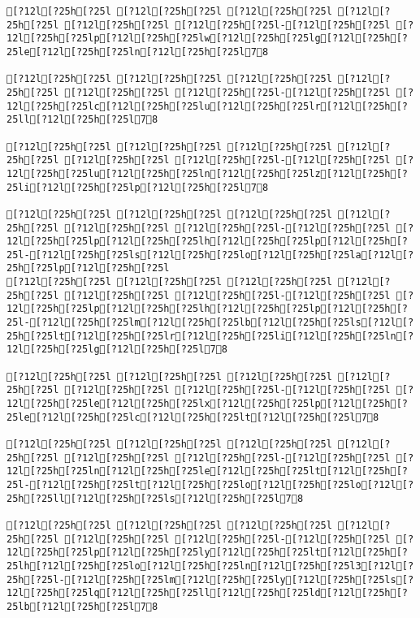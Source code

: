 \documentclass{scrartcl}
\begin{document}
\begin{Verbatim}
[?12l[?25h[?25l [?12l[?25h[?25l [?12l[?25h[?25l [?12l[?25h[?25l [?12l[?25h[?25l [?12l[?25h[?25l-[?12l[?25h[?25l [?12l[?25h[?25lp[?12l[?25h[?25lw[?12l[?25h[?25lg[?12l[?25h[?25le[?12l[?25h[?25ln[?12l[?25h[?25l78

[?12l[?25h[?25l [?12l[?25h[?25l [?12l[?25h[?25l [?12l[?25h[?25l [?12l[?25h[?25l [?12l[?25h[?25l-[?12l[?25h[?25l [?12l[?25h[?25lc[?12l[?25h[?25lu[?12l[?25h[?25lr[?12l[?25h[?25ll[?12l[?25h[?25l78

[?12l[?25h[?25l [?12l[?25h[?25l [?12l[?25h[?25l [?12l[?25h[?25l [?12l[?25h[?25l [?12l[?25h[?25l-[?12l[?25h[?25l [?12l[?25h[?25lu[?12l[?25h[?25ln[?12l[?25h[?25lz[?12l[?25h[?25li[?12l[?25h[?25lp[?12l[?25h[?25l78

[?12l[?25h[?25l [?12l[?25h[?25l [?12l[?25h[?25l [?12l[?25h[?25l [?12l[?25h[?25l [?12l[?25h[?25l-[?12l[?25h[?25l [?12l[?25h[?25lp[?12l[?25h[?25lh[?12l[?25h[?25lp[?12l[?25h[?25l-[?12l[?25h[?25ls[?12l[?25h[?25lo[?12l[?25h[?25la[?12l[?25h[?25lp[?12l[?25h[?25l
[?12l[?25h[?25l [?12l[?25h[?25l [?12l[?25h[?25l [?12l[?25h[?25l [?12l[?25h[?25l [?12l[?25h[?25l-[?12l[?25h[?25l [?12l[?25h[?25lp[?12l[?25h[?25lh[?12l[?25h[?25lp[?12l[?25h[?25l-[?12l[?25h[?25lm[?12l[?25h[?25lb[?12l[?25h[?25ls[?12l[?25h[?25lt[?12l[?25h[?25lr[?12l[?25h[?25li[?12l[?25h[?25ln[?12l[?25h[?25lg[?12l[?25h[?25l78

[?12l[?25h[?25l [?12l[?25h[?25l [?12l[?25h[?25l [?12l[?25h[?25l [?12l[?25h[?25l [?12l[?25h[?25l-[?12l[?25h[?25l [?12l[?25h[?25le[?12l[?25h[?25lx[?12l[?25h[?25lp[?12l[?25h[?25le[?12l[?25h[?25lc[?12l[?25h[?25lt[?12l[?25h[?25l78

[?12l[?25h[?25l [?12l[?25h[?25l [?12l[?25h[?25l [?12l[?25h[?25l [?12l[?25h[?25l [?12l[?25h[?25l-[?12l[?25h[?25l [?12l[?25h[?25ln[?12l[?25h[?25le[?12l[?25h[?25lt[?12l[?25h[?25l-[?12l[?25h[?25lt[?12l[?25h[?25lo[?12l[?25h[?25lo[?12l[?25h[?25ll[?12l[?25h[?25ls[?12l[?25h[?25l78

[?12l[?25h[?25l [?12l[?25h[?25l [?12l[?25h[?25l [?12l[?25h[?25l [?12l[?25h[?25l [?12l[?25h[?25l-[?12l[?25h[?25l [?12l[?25h[?25lp[?12l[?25h[?25ly[?12l[?25h[?25lt[?12l[?25h[?25lh[?12l[?25h[?25lo[?12l[?25h[?25ln[?12l[?25h[?25l3[?12l[?25h[?25l-[?12l[?25h[?25lm[?12l[?25h[?25ly[?12l[?25h[?25ls[?12l[?25h[?25lq[?12l[?25h[?25ll[?12l[?25h[?25ld[?12l[?25h[?25lb[?12l[?25h[?25l78


\end{Verbatim}
\end{document}
